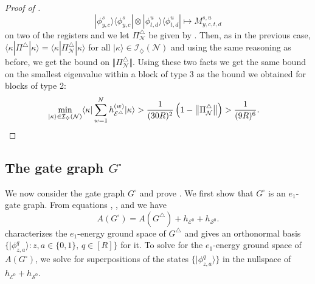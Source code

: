 \documentclass[../thesis-main/thesis-main]{subfiles}
\begin{document}
\begin{proof}[Proof of \protect{}]
\[
|\phi_{y,c}^{s}\rangle\langle\phi_{y,c}^{s}|\otimes|\phi_{t,d}^{u}\rangle\langle\phi_{t,d}^{u}|\mapsto M_{y,c,t,d}^{s,u}
\]
on two of the registers and we let $\Pi_{\mathcal{N}}^{\triangle}$ be given by . Then, as in the previous case, $\langle\kappa|\Pi^{\triangle}|\kappa\rangle=\langle\kappa|\Pi_{\mathcal{N}}^{\triangle}|\kappa\rangle$ for all $|\kappa\rangle\in\mathcal{I}_{\diamondsuit}(\mathcal{N})$ and using the same reasoning as before, we get the bound  on $\Vert \Pi_{\mathcal{N}}^{\triangle}\Vert $. Using these two facts we get the same bound on the smallest eigenvalue within a block of type 3 as the bound we obtained for blocks of type 2:
\begin{align*}
\min_{|\kappa\rangle\in\mathcal{I}_{\diamondsuit}(\mathcal{N})}\langle\kappa|\sum_{w=1}^{N}h_{\mathcal{E}^{\triangle}}^{(w)}|\kappa\rangle &>\frac{1}{(30R)^{2}}\left(1-\big\Vert \Pi_{\mathcal{N}}^{\triangle}\big\Vert \right)>\frac{1}{(9R)^{6}}.\qedhere
\end{align*}
\end{proof}

\subsection{The gate graph $G^{\square}$ }

We now consider the gate graph $G^{\square}$ and prove . We first show that $G^{\square}$ is an $e_{1}$-gate graph. From equations , , and  we have
\begin{equation}
A(G^{\square})=A(G^{\triangle})+h_{\mathcal{E}^{0}}+h_{\mathcal{S}^{0}}.\label{eq:A_g_square_triangle}
\end{equation}
 characterizes the $e_{1}$-energy ground space of $G^{\triangle}$ and gives an orthonormal basis $\{|\phi_{z,a}^{q}\rangle\colon z,a\in\{0,1\},\, q\in[R]\}$ for it. To solve for the $e_{1}$-energy ground space of $A(G^{\square})$, we solve for superpositions of the states $\{|\phi_{z,a}^{q}\rangle\}$ in the nullspace of $h_{\mathcal{E}^{0}}+h_{\mathcal{S}^{0}}$.
\end{document}
